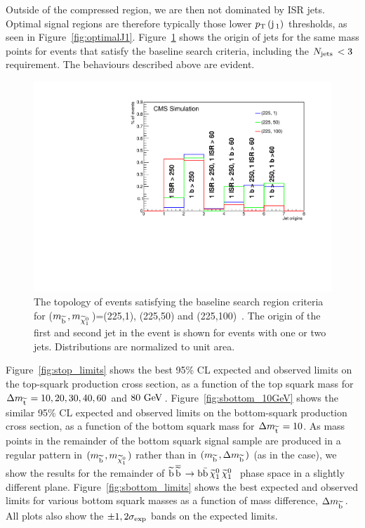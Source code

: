 Outside of the compressed region, we are then not dominated by \ac{ISR} jets. Optimal signal regions are therefore typically those lower $p_{\text{T}}\,({\rm j}\,_1)$ thresholds, as seen in Figure~\ref{fig:optimalJ1}.
Figure~\ref{fig:jetContent225} shows the origin of jets for the same mass points for events that satisfy the baseline search criteria, including the $N_{\text{jets}}\,<3$ requirement.
The behaviours described above are evident. 

\begin{figure}[!Hhtb]
  \begin{center}
  \includegraphics[scale=0.39]{Figures/sus13009/eventTypes_225.pdf}
  \caption{The topology of events satisfying the baseline search region criteria for ($m_{\widetilde{{\rm b}}\,}, m_{\widetilde{\chi}^{0}_{1}\,}$)=(225,1), (225,50) and (225,100)~\GeV. The origin of the first and second jet in the event is shown for events with one or two jets. Distributions are normalized to unit area.}
  \label{fig:jetContent225}
  \end{center}
\end{figure}

%
Figure~\ref{fig:stop_limits} shows the best 95\% CL expected and observed limits on the top-squark production cross section, 
as a function of the top squark mass for $\Delta m_{\widetilde{{\rm t}}\,} = 10, 20, 30, 40, 60$ and $80~\mathrm{GeV}\,$.
Figure~\ref{fig:sbottom_10GeV} shows the similar 95\% CL expected and observed limits on the bottom-squark production cross section, 
as a function of the bottom squark mass for $\Delta m_{\widetilde{{\rm t}}\,} = 10$. 
As mass points in the remainder of the bottom squark signal sample are produced in a regular pattern in $(m_{\widetilde{{\rm b}}\,}, m_{\widetilde{\chi}^{0}_{1}\,})$ rather than in $(m_{\widetilde{{\rm b}}\,}, \Delta m_{\widetilde{{\rm b}}\,})$ (as in the \ttwocc case), we show the results for the remainder of $\widetilde{{\rm b}}\, \overline{\widetilde{\mathrm{b}}}\, \rightarrow \rm b \bar{\rm b}\, \widetilde{\chi}^{0}_{1}\, \widetilde{\chi}^{0}_{1}\, \,$ phase space in a slightly different plane.
Figure~\ref{fig:sbottom_limits} shows the best expected and observed limits for various bottom squark masses as a function of mass difference, $\Delta m_{\widetilde{{\rm b}}\,}$.
All plots also show the $\pm1,2 \sigma_{\rm exp}$ bands on the expected limits.




